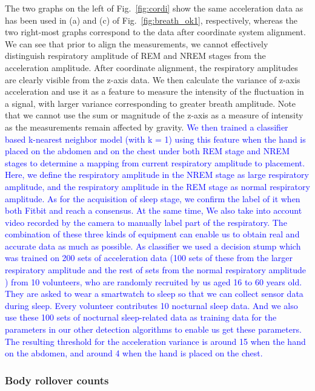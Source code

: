 The two graphs on the left of Fig.~\ref{fig:cordi} show the same acceleration data as has been used in (a) and (c) of Fig.~\ref{fig:breath_ok1}, respectively, whereas the two right-most graphs correspond to the data after coordinate system alignment.  We can see that prior to align the measurements, we cannot effectively distinguish respiratory amplitude of REM and NREM stages from the acceleration amplitude. After coordinate alignment, the respiratory amplitudes are clearly visible from the z-axis data. We then calculate the variance of z-axis acceleration and use it as a feature to measure the intensity of the fluctuation in a signal, with larger variance corresponding to greater breath amplitude. Note that we cannot use the sum or magnitude of the z-axis as a measure of intensity as the measurements remain affected by gravity. \textcolor{blue}{We then trained a classifier based k-nearest neighbor model (with k = 1) using this feature when the hand is placed on the abdomen and on the chest under both REM stage and NREM stages to determine a mapping from current respiratory amplitude to placement. Here, we define the respiratory amplitude in the NREM stage as large respiratory amplitude, and the respiratory amplitude in the REM stage as normal respiratory amplitude. As for the acquisition of sleep stage, we confirm the label of it when both Fitbit and {\systemname} reach a consensus. At the same time, We also take into account video recorded by the camera to manually label part of the respiratory. The combination of these three kinds of equipment can enable us to obtain real and accurate data as much as possible.  As classifier we used a decision stump which was trained on 200 sets of acceleration data (100 sets of these from the larger respiratory amplitude and the rest of sets from the normal respiratory amplitude ) from 10 volunteers, who are randomly recruited by us aged 16 to 60 years old. They are asked to wear a smartwatch to sleep so that we can collect sensor data during sleep. Every volunteer contributes 10 nocturnal sleep data. And we also use these 100 sets of nocturnal sleep-related data as training data for the parameters in our other detection algorithms to enable us get these parameters. The resulting threshold for the acceleration variance is around 15 when the hand on the abdomen, and around 4 when the hand is placed on the chest.}



\subsubsection{Body rollover counts \label{sec:bodyrollover}}

